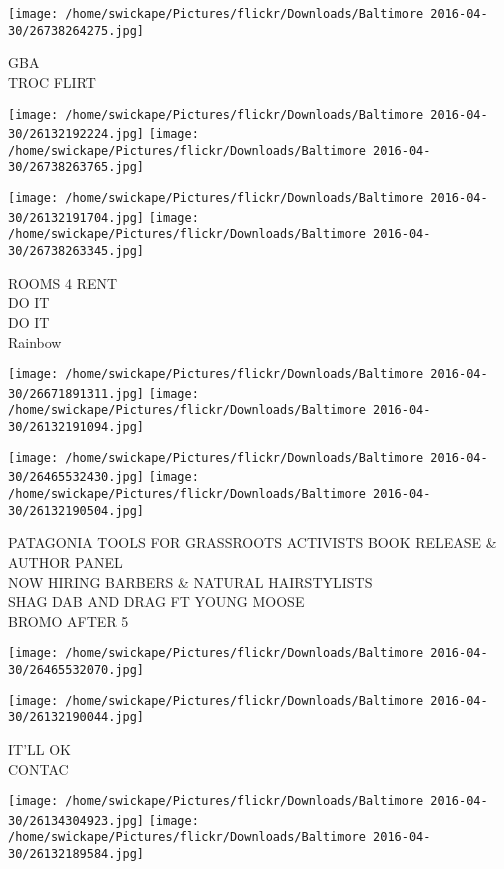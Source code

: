 \documentclass[10pt,letterpaper]{article}
\begin{document}
\vspace{0.25in}
\texttt{[image: /home/swickape/Pictures/flickr/Downloads/Baltimore 2016-04-30/26738264275.jpg]}

GBA\\
TROC FLIRT\\
\pagebreak

\texttt{[image: /home/swickape/Pictures/flickr/Downloads/Baltimore 2016-04-30/26132192224.jpg]}
\texttt{[image: /home/swickape/Pictures/flickr/Downloads/Baltimore 2016-04-30/26738263765.jpg]}

\texttt{[image: /home/swickape/Pictures/flickr/Downloads/Baltimore 2016-04-30/26132191704.jpg]}
\texttt{[image: /home/swickape/Pictures/flickr/Downloads/Baltimore 2016-04-30/26738263345.jpg]}

ROOMS 4 RENT\\
DO IT\\
DO IT\\
Rainbow\\
\pagebreak

\texttt{[image: /home/swickape/Pictures/flickr/Downloads/Baltimore 2016-04-30/26671891311.jpg]}
\texttt{[image: /home/swickape/Pictures/flickr/Downloads/Baltimore 2016-04-30/26132191094.jpg]}

\texttt{[image: /home/swickape/Pictures/flickr/Downloads/Baltimore 2016-04-30/26465532430.jpg]}
\texttt{[image: /home/swickape/Pictures/flickr/Downloads/Baltimore 2016-04-30/26132190504.jpg]}

PATAGONIA TOOLS FOR GRASSROOTS ACTIVISTS BOOK RELEASE \& AUTHOR PANEL\\
NOW HIRING BARBERS \& NATURAL HAIRSTYLISTS\\
SHAG DAB AND DRAG FT YOUNG MOOSE\\
BROMO AFTER 5\\
\pagebreak

\texttt{[image: /home/swickape/Pictures/flickr/Downloads/Baltimore 2016-04-30/26465532070.jpg]}

\vspace{0.25in}
\texttt{[image: /home/swickape/Pictures/flickr/Downloads/Baltimore 2016-04-30/26132190044.jpg]}

IT'LL OK\\
CONTAC\\
\pagebreak

\texttt{[image: /home/swickape/Pictures/flickr/Downloads/Baltimore 2016-04-30/26134304923.jpg]}
\texttt{[image: /home/swickape/Pictures/flickr/Downloads/Baltimore 2016-04-30/26132189584.jpg]}
\end{document}
